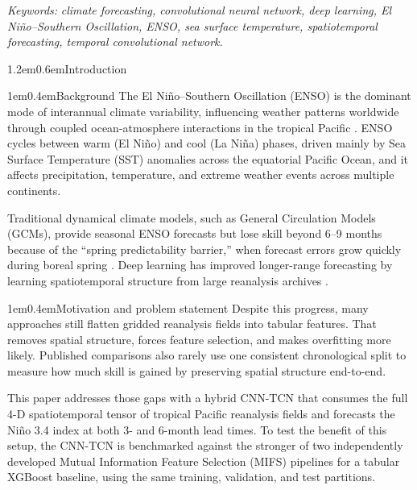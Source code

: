 \documentclass[10pt,a4paper]{article}
\makeatletter
\renewcommand\section{\@startsection{section}{1}{\z@}%
  {1.2em}{0.6em}{\normalfont\fontsize{10}{12}\selectfont\bfseries}}
\renewcommand\subsection{\@startsection{subsection}{2}{\z@}%
  {1em}{0.4em}{\normalfont\fontsize{10}{12}\selectfont\bfseries\itshape}}
\makeatother
\begin{document}
\vspace{0.3em}
\textit{Keywords:} \textit{climate forecasting, convolutional neural network, deep learning, El Ni\~no--Southern Oscillation, ENSO, sea surface temperature, spatiotemporal forecasting, temporal convolutional network.}
\vspace{0.4em}


\section{Introduction}

\subsection{Background}
The El Ni\~no--Southern Oscillation (ENSO) is the dominant mode of interannual climate variability, influencing weather patterns worldwide through coupled ocean-atmosphere interactions in the tropical Pacific \cite{ham2019}. ENSO cycles between warm (El Ni\~no) and cool (La Ni\~na) phases, driven mainly by Sea Surface Temperature (SST) anomalies across the equatorial Pacific Ocean, and it affects precipitation, temperature, and extreme weather events across multiple continents.

Traditional dynamical climate models, such as General Circulation Models (GCMs), provide seasonal ENSO forecasts but lose skill beyond 6--9 months because of the ``spring predictability barrier,'' when forecast errors grow quickly during boreal spring \cite{mahesh2024}. Deep learning has improved longer-range forecasting by learning spatiotemporal structure from large reanalysis archives \cite{ham2019, mahesh2024}.

\subsection{Motivation and problem statement}
Despite this progress, many approaches still flatten gridded reanalysis fields into tabular features. That removes spatial structure, forces feature selection, and makes overfitting more likely. Published comparisons also rarely use one consistent chronological split to measure how much skill is gained by preserving spatial structure end-to-end.

This paper addresses those gaps with a hybrid CNN-TCN that consumes the full 4-D spatiotemporal tensor of tropical Pacific reanalysis fields and forecasts the Ni\~no 3.4 index at both 3- and 6-month lead times. To test the benefit of this setup, the CNN-TCN is benchmarked against the stronger of two independently developed Mutual Information Feature Selection (MIFS) pipelines for a tabular XGBoost baseline, using the same training, validation, and test partitions.
\end{document}

